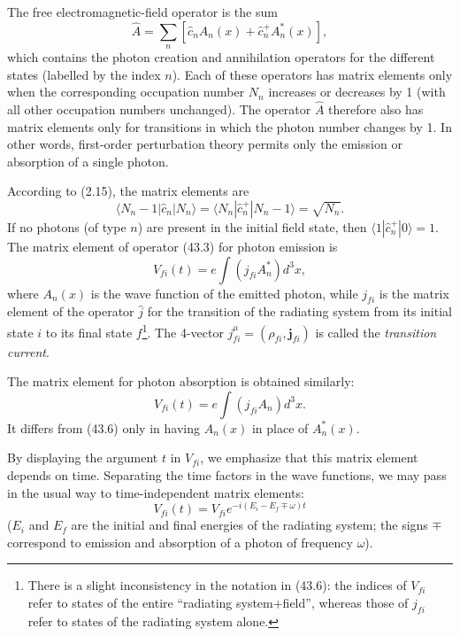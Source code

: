 The free electromagnetic-field operator is the sum
\begin{equation}
\hat A=\sum_n[\hat c_n A_n(x)+\hat c_n^+ A_n^*(x)],
\tag{43.4}
\end{equation}
which contains the photon creation and annihilation operators for the different states (labelled by the index $n$). Each of these operators has matrix elements only when the corresponding occupation number $N_n$ increases or decreases by 1 (with all other occupation numbers unchanged). The operator $\hat A$ therefore also has matrix elements only for transitions in which the photon number changes by 1. In other words, first-order perturbation theory permits only the emission or absorption of a single photon.

According to (2.15), the matrix elements are
\begin{equation}
\langle N_n-1|\hat c_n|N_n\rangle
=\langle N_n|\hat c_n^+|N_n-1\rangle=\sqrt{N_n}.
\tag{43.5}
\end{equation}
If no photons (of type $n$) are present in the initial field state, then $\langle1|\hat c_n^+|0\rangle=1$. The matrix element of operator (43.3) for photon emission is
\begin{equation}
V_{fi}(t)=e\int(j_{fi}A_n^*)d^3x,
\tag{43.6}
\end{equation}
where $A_n(x)$ is the wave function of the emitted photon, while $j_{fi}$ is the matrix element of the operator $\hat j$ for the transition of the radiating system from its initial state $i$ to its final state $f$\footnote{There is a slight inconsistency in the notation in (43.6): the indices of $V_{fi}$ refer to states of the entire ``radiating system+field'', whereas those of $j_{fi}$ refer to states of the radiating system alone.}. The 4-vector $j_{fi}^\mu=(\rho_{fi},\mathbf j_{fi})$ is called the \emph{transition current}.

The matrix element for photon absorption is obtained similarly:
\begin{equation}
V_{fi}(t)=e\int(j_{fi}A_n)d^3x.
\tag{43.7}
\end{equation}
It differs from (43.6) only in having $A_n(x)$ in place of $A_n^*(x)$.

By displaying the argument $t$ in $V_{fi}$, we emphasize that this matrix element depends on time. Separating the time factors in the wave functions, we may pass in the usual way to time-independent matrix elements:
\begin{equation}
V_{fi}(t)=V_{fi}e^{-i(E_i-E_f\mp\omega)t}
\tag{43.8}
\end{equation}
($E_i$ and $E_f$ are the initial and final energies of the radiating system; the signs $\mp$ correspond to emission and absorption of a photon of frequency $\omega$).


